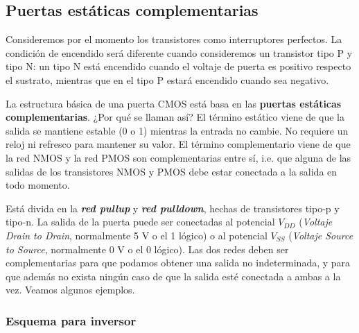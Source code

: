 \subsection{Puertas estáticas complementarias}

Consideremos por el momento los transistores como interruptores perfectos. La condición de encendido será diferente cuando consideremos un transistor tipo P y tipo N: un tipo N está encendido cuando el voltaje de puerta es positivo respecto el sustrato, mientras que en el tipo P estará encendido cuando sea negativo. 

La estructura básica de una puerta CMOS está basa en las \textbf{puertas estáticas complementarias}. ¿Por qué se llaman así? El término estático viene de que la salida se mantiene estable (0 o 1) mientras la entrada no cambie. No requiere un reloj ni refresco para mantener su valor. El término complementario viene de que la red NMOS y la red PMOS son complementarias entre sí, i.e. que alguna de las salidas de los transistores NMOS y PMOS debe estar conectada a la salida en todo momento. 

Está divida en la \textbf{\textit{red pullup}} y \textbf{\textit{red pulldown}}, hechas de transistores tipo-p y tipo-n. La salida de la puerta puede ser conectadas al potencial $V_{DD}$ (\textit{Voltaje Drain to Drain}, normalmente 5 V o el 1 lógico) o al potencial $V_{SS}$ (\textit{Voltaje Source to Source}, normalmente 0 V o el 0 lógico). Las dos redes deben ser complementarias para que podamos obtener una salida no indeterminada, y para que además no exista ningún caso de que la salida esté conectada a ambas a la vez. Veamos algunos ejemplos. 

\subsubsection{Esquema para inversor}

